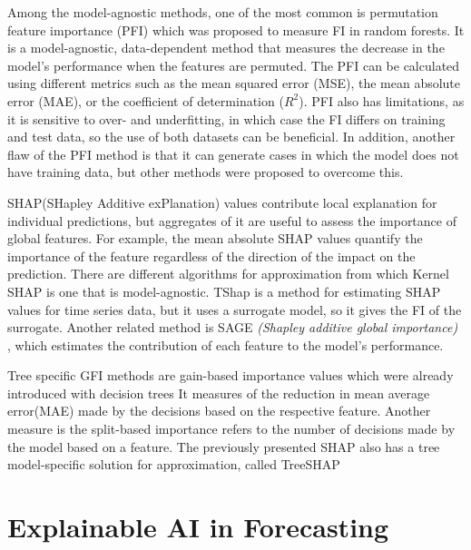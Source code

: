 Among the model-agnostic methods, one of the most common is permutation feature importance (PFI) which was proposed to measure FI in random forests\cite{Breiman2001}.
It is a model-agnostic, data-dependent method that measures the decrease in the model's performance when the features are permuted.
The PFI can be calculated using different metrics such as the mean squared error (MSE), the mean absolute error (MAE), or the coefficient of determination ($R^2$).
PFI also has limitations, as it is sensitive to over- and underfitting\cite{molnar2020limitations}, in which case the FI differs on training and test data, so the use of both datasets can be beneficial.
In addition, another flaw of the PFI method is that it can generate cases in which the model does not have training data\cite{Molnar_2020_pitfalls,giles_hooker_unrestricted_2021},
but other methods were proposed to overcome this\cite{ian_covert_understanding_2020, kristin_blesch_conditional_2023}.

SHAP(SHapley Additive exPlanation)\cite{scott_lundberg_unified_2017} values contribute local explanation for individual predictions, but aggregates of it are useful to assess the importance of global features.
For example, the mean absolute SHAP values quantify the importance of the feature regardless of the direction of the impact on the prediction.
There are different algorithms for approximation from which Kernel SHAP\cite{scott_lundberg_unified_2017} is one that is model-agnostic.
TShap \cite{vikas_c_raykar_tsshap_2023} is a method for estimating SHAP values for time series data, but it uses a surrogate model, so it gives the FI of the surrogate.
Another related method is SAGE \emph{(Shapley additive global importance)} \cite{ian_covert_understanding_2020}, which estimates the contribution of each feature to the model's performance.

Tree specific GFI methods are gain-based importance values which were already introduced with decision trees \cite{gordon_classification_1984}
It measures of the reduction in mean average error(MAE) made by the decisions based on the respective feature.
Another measure is the split-based importance\cite{tianqi_chen_xgboost_2016} refers to the number of decisions made by the model based on a feature.
The previously presented SHAP also has a tree model-specific solution for approximation, called TreeSHAP \cite{scott_lundberg_local_2020}




\section{Explainable AI in Forecasting}
\label{sec:explainable_ai_in_forecasting}

